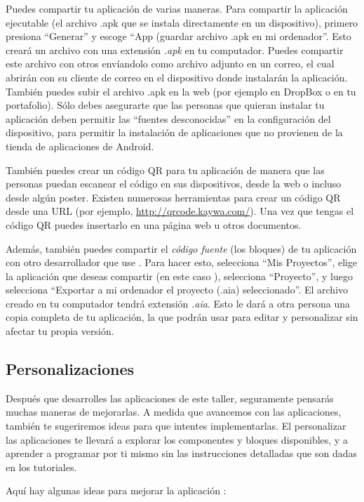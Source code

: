 \documentclass[letterpaper]{article}
\begin{document}
Puedes compartir tu aplicación de varias maneras. Para compartir la
aplicación ejecutable (el archivo .apk que se instala directamente en
un dispositivo), primero presiona ``Generar'' y escoge ``App (guardar
archivo .apk en mi ordenador''. Esto creará un archivo con una
extensión \emph{.apk} en tu computador. Puedes compartir este archivo
con otros envíandolo como archivo adjunto en un correo, el cual
abrirán con su cliente de correo en el dispositivo donde instalarán la
aplicación. También puedes subir el archivo .apk en la web (por
ejemplo en DropBox o en tu portafolio). Sólo debes asegurarte que las
personas que quieran instalar tu aplicación deben permitir las
``fuentes desconocidas'' en la configuración del dispositivo, para
permitir la instalación de aplicaciones que no provienen de la tienda
de aplicaciones de Android.

También puedes crear un código QR para tu aplicación de manera que las
personas puedan escanear el código en sus dispositivos, desde la web o
incluso desde algún poster. Existen numerosas herramientas para crear
un código QR desde una URL (por ejemplo,
\url{http://qrcode.kaywa.com/}). Una vez que tengas el código QR
puedes insertarlo en una página web u otros documentos.

Además, también puedes compartir el \emph{código fuente} (los bloques)
de tu aplicación con otro desarrollador que use \AppInventor. Para
hacer esto, selecciona ``Mis Proyectos'', elige la aplicación que
deseas compartir (en este caso ), selecciona
``Proyecto'', y luego selecciona ``Exportar a mi ordenador el proyecto
(.aia) seleccionado''. El archivo creado en tu computador tendrá
extensión \emph{.aia}. Esto le dará a otra persona una copia completa
de tu aplicación, la que podrán usar para editar y personalizar sin
afectar tu propia versión.

\subsection*{Personalizaciones}

Después que desarrolles las aplicaciones de este taller, seguramente
pensarás muchas maneras de mejorarlas. A medida que avancemos con las
aplicaciones, también te sugeriremos ideas para que intentes
implementarlas. El personalizar las aplicaciones te llevará a explorar
los componentes y bloques disponibles, y a aprender a programar por ti
mismo sin las instrucciones detalladas que son dadas en los
tutoriales. 

Aquí hay algunas ideas para mejorar la aplicación :
\end{document}
